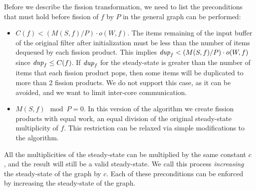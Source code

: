 Before we describe the fission transformation, we need to list the
preconditions that must hold before fission of $f$ by $P$ in the general
graph can be performed:
\begin{itemize}
\item $C(f) < (M(S,f) / P) \cdot o(W, f)$. The items remaining of
  the input buffer of the original filter after initialization must be
  less than the number of items dequeued by each fission product.
  This implies $\mbox{\it dup}_f < (M(S,f) / P) \cdot o(W, f)$ since
  $\mbox{\it dup}_f \le C(f)$.  If $\mbox{\it dup}_f$ for the steady-state is greater
  than the number of items that each fission product pops, then some
  items will be duplicated to more than 2 fission products.  We do not
  support this case, as it can be avoided, and we want to limit
  inter-core communication.

\item $M(S,f) \mod P = 0$. In this version of the algorithm we create
  fission products with equal work, an equal division of the original
  steady-state multiplicity of $f$.  This restriction can be relaxed
  via simple modifications to the algorithm.
\end{itemize}
\noindent All the multiplicities of the steady-state can be multiplied
by the same constant $c$, and the result will still be a valid
steady-state.  We call this process {\it increasing} the steady-state
of the graph by $c$.  Each of these preconditions can be enforced by
increasing the steady-state of the graph.


